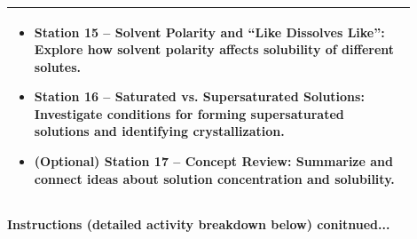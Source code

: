 \documentclass{article}
\begin{document}
\begin{tabular}{|p{0.9\linewidth}|}
\begin{minipage}[t]{\linewidth}
\begin{enumerate}
\begin{itemize}
            \item \textbf{Station 15 – Solvent Polarity and “Like Dissolves Like”:} Explore how solvent polarity affects solubility of different solutes.  
            \item \textbf{Station 16 – Saturated vs. Supersaturated Solutions:} Investigate conditions for forming supersaturated solutions and identifying crystallization.  
            \item \textbf{(Optional) Station 17 – Concept Review:} Summarize and connect ideas about solution concentration and solubility.
    \end{itemize}
\end{enumerate}
\end{minipage} \\
\hline
\end{tabular}
\newpage

\vspace{0.5cm}
\noindent
{\large \textbf{Instructions (detailed activity breakdown below) conitnued...}} \\
\end{document}
